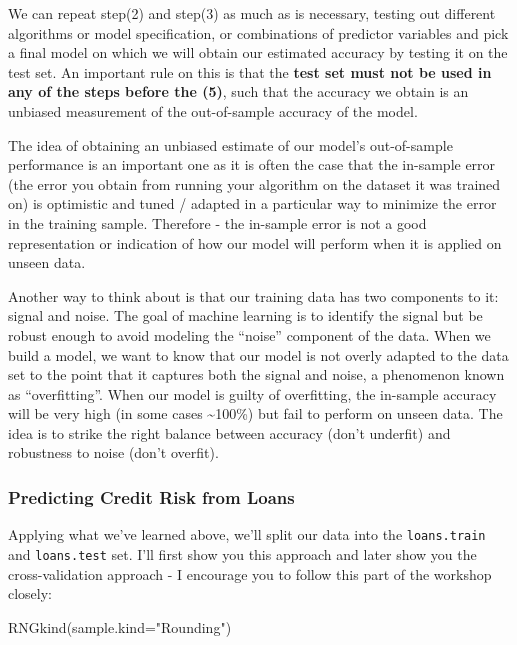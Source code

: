 \documentclass[
]{article}
\newenvironment{Shaded}{\begin{snugshade}}{\end{snugshade}}
\newcommand{\AttributeTok}[1]{\textcolor[rgb]{0.77,0.63,0.00}{#1}}
\newcommand{\FunctionTok}[1]{\textcolor[rgb]{0.00,0.00,0.00}{#1}}
\newcommand{\NormalTok}[1]{#1}
\newcommand{\StringTok}[1]{\textcolor[rgb]{0.31,0.60,0.02}{#1}}
\begin{document}
We can repeat step(2) and step(3) as much as is necessary, testing out
different algorithms or model specification, or combinations of
predictor variables and pick a final model on which we will obtain our
estimated accuracy by testing it on the test set. An important rule on
this is that the \textbf{test set must not be used in any of the steps
before the (5)}, such that the accuracy we obtain is an unbiased
measurement of the out-of-sample accuracy of the model.

The idea of obtaining an unbiased estimate of our model's out-of-sample
performance is an important one as it is often the case that the
in-sample error (the error you obtain from running your algorithm on the
dataset it was trained on) is optimistic and tuned / adapted in a
particular way to minimize the error in the training sample. Therefore -
the in-sample error is not a good representation or indication of how
our model will perform when it is applied on unseen data.

Another way to think about is that our training data has two components
to it: signal and noise. The goal of machine learning is to identify the
signal but be robust enough to avoid modeling the ``noise'' component of
the data. When we build a model, we want to know that our model is not
overly adapted to the data set to the point that it captures both the
signal and noise, a phenomenon known as ``overfitting''. When our model
is guilty of overfitting, the in-sample accuracy will be very high (in
some cases \textasciitilde100\%) but fail to perform on unseen data. The
idea is to strike the right balance between accuracy (don't underfit)
and robustness to noise (don't overfit).

\hypertarget{predicting-credit-risk-from-loans}{%
\subsubsection{Predicting Credit Risk from
Loans}\label{predicting-credit-risk-from-loans}}

Applying what we've learned above, we'll split our data into the
\texttt{loans.train} and \texttt{loans.test} set. I'll first show you
this approach and later show you the cross-validation approach - I
encourage you to follow this part of the workshop closely:

\begin{Shaded}
\begin{Highlighting}[]
\FunctionTok{RNGkind}\NormalTok{(}\AttributeTok{sample.kind=}\StringTok{"Rounding"}\NormalTok{)}
\end{Highlighting}
\end{Shaded}
\end{document}
